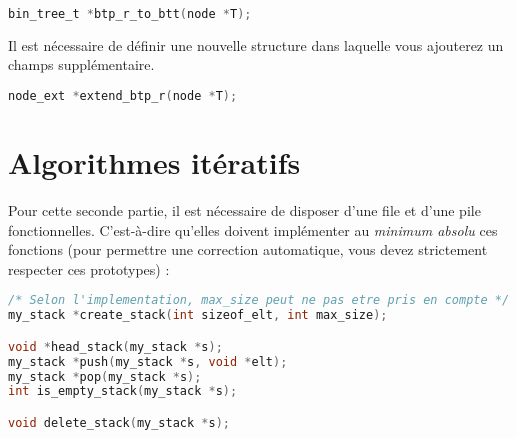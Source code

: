 \documentclass[11pt,a4paper]{article}
\begin{document}
\begin{lstlisting}[language=C]
bin_tree_t *btp_r_to_btt(node *T); \end{lstlisting}



Il est nécessaire de définir une nouvelle structure  dans laquelle vous ajouterez un champs supplémentaire.

\begin{lstlisting}[language=C]
node_ext *extend_btp_r(node *T); \end{lstlisting}

\bigskip

\clearpage

\section{Algorithmes itératifs}

\bigskip

Pour cette seconde partie, il est nécessaire de disposer d'une file et d'une pile fonctionnelles.
C'est-à-dire qu'elles doivent implémenter au \textit{minimum absolu} ces fonctions (pour permettre une correction automatique, vous devez strictement respecter ces prototypes) :

\bigskip


\begin{lstlisting}[language=C]
/* Selon l'implementation, max_size peut ne pas etre pris en compte */
my_stack *create_stack(int sizeof_elt, int max_size);

void *head_stack(my_stack *s);
my_stack *push(my_stack *s, void *elt);
my_stack *pop(my_stack *s);
int is_empty_stack(my_stack *s);

void delete_stack(my_stack *s); \end{lstlisting}


\vspace*{-0.5cm}


\end{document}
